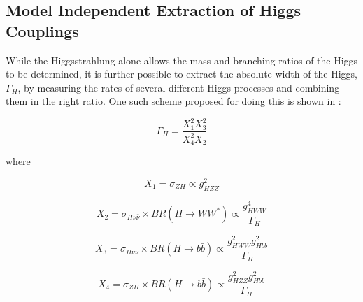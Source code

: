  
\subsection{Model Independent Extraction of Higgs Couplings}


While the Higgsstrahlung alone allows the mass and branching ratios of the Higgs to be determined, it is further possible to extract the absolute width of the Higgs, $\Gamma_H$, by measuring the rates of several different Higgs processes and combining them in the right ratio. One such scheme proposed for doing this is shown in  \cite{Durig:2014lfa}:

\begin{equation}
  \label{modelindependentformula}
  \Gamma_H = \frac{X_1^2X_3^2}{X_4^2X_2}
\end{equation}

where

\begin{equation}
X_1=\sigma_{ZH} \propto g_{HZZ}^2
\end{equation}

\begin{equation}
  \label{X2}
  X_2=\sigma_{H\nu\bar{\nu}} \times BR(H\rightarrow WW^*) \propto \frac{g_{HWW}^4}{\Gamma_H}
\end{equation}

\begin{equation}
X_3=\sigma_{H\nu\bar{\nu}} \times BR(H\rightarrow b\bar{b}) \propto \frac{g_{HWW}^{2}g_{Hbb}^2}{\Gamma_H}
\end{equation}

\begin{equation}
X_4=\sigma_{ZH} \times BR(H\rightarrow b\bar{b}) \propto \frac{g_{HZZ}^{2}g_{Hbb}^2}{\Gamma_H}
\end{equation}

